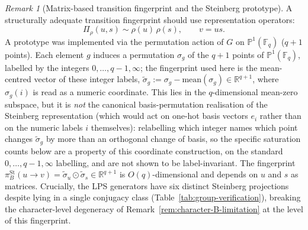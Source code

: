 \documentclass[11pt,a4paper]{article}
\theoremstyle{plain}
\theoremstyle{definition}
\theoremstyle{remark}
\newtheorem{remark}[theorem]{Remark}
\newcommand{\F}{\mathbb{F}}
\newcommand{\R}{\mathbb{R}}
\begin{document}
      \begin{remark}[Matrix-based transition fingerprint and the Steinberg prototype]
        \label{rem:matrix-B}
        A structurally adequate transition fingerprint should use representation operators:
        \[
          \Pi_\rho(u, s) \sim \rho(u)\,\rho(s), \qquad v = us.
        \]
        A prototype was implemented via the permutation action of $G$ on $\mathbb{P}^1(\F_q)$
        ($q+1$ points).
        Each element $g$ induces a permutation $\sigma_g$ of the $q+1$ points of $\mathbb P^1(\F_q)$,
        labelled by the integers $0,\ldots,q-1,\infty$; the fingerprint used here is the
        mean-centred vector of these integer labels, $\tilde{\sigma}_g := \sigma_g -
        \mathrm{mean}(\sigma_g) \in \R^{q+1}$, where $\sigma_g(i)$ is read as a numeric coordinate.
        This lies in the $q$-dimensional mean-zero subspace, but it is \emph{not} the canonical
        basis-permutation realisation of the Steinberg representation (which would act on
        one-hot basis vectors $e_i$ rather than on the numeric labels $i$ themselves): relabelling
        which integer names which point changes $\tilde\sigma_g$ by more than an orthogonal change
        of basis, so the specific saturation counts below are a property of this coordinate
        construction, on the standard $0,\ldots,q-1,\infty$ labelling, and are not shown to be
        label-invariant.
        The fingerprint $\pi_B^{\mathrm{St}}(u\to v) = \tilde{\sigma}_u \odot \tilde{\sigma}_s
        \in \R^{q+1}$ is $O(q)$-dimensional and depends on $u$ and $s$ as matrices.
        Crucially, the LPS generators have six distinct Steinberg projections despite lying in a
        single conjugacy class (Table~\ref{tab:group-verification}), breaking the character-level
        degeneracy of Remark~\ref{rem:character-B-limitation} at the level of this fingerprint.


\end{remark}
\end{document}
